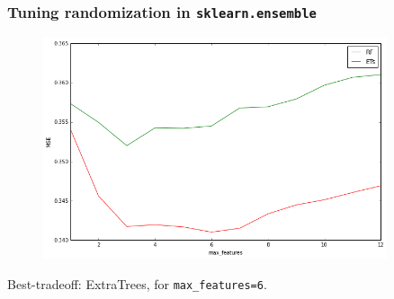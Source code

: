 \documentclass{beamer}
\begin{document}
\begin{frame}[fragile]
    \frametitle{Tuning randomization in \texttt{sklearn.ensemble}}
    \begin{figure}
        \includegraphics[width=0.9\textwidth]{./figures/randomness.png}
    \end{figure}

    \begin{center}
        Best-tradeoff: ExtraTrees, for \texttt{max\_features=6}.
    \end{center}
\end{frame}
\end{document}
